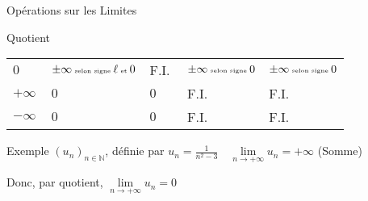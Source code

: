 \documentclass{cours}
\begin{document}
\begin{Gpartie}{Opérations sur les Limites}
\begin{Spartie}{Quotient}
\begin{table}[H]
{\begin{tabular}{ p{0.15\linewidth} *{4}{M{0.17\linewidth} }}
                        $0$             & $\pm\infty\text{\tiny{ selon signe }}\ell\text{\tiny{ et }}0$ & F.I.& $\pm\infty\text{\tiny{ selon signe }}0$     & $\pm\infty\text{\tiny{ selon signe }}0$       \\
                        $+\infty$       & $0$                                                           & $0$ & F.I.                                        & F.I.                                          \\ 
                        $-\infty$       & $0$                                                           & $0$ & F.I.                                        & F.I.                                          \\ \bottomrule
                    \end{tabular}
                }
            \end{table}
            \begin{SSpartie}{Exemple} 
                $(u_n)_{n\in\mathbb{N}}$, définie par $u_n=\frac{1}{n^2-3}\quad\lim\limits_{n\to +\infty}u_n=+\infty$ (Somme)

                Donc, par quotient, $\lim\limits_{n\to +\infty}u_n=0$
            \end{SSpartie}
        \end{Spartie}
    \end{Gpartie}
    \pagebreak
\end{document}
